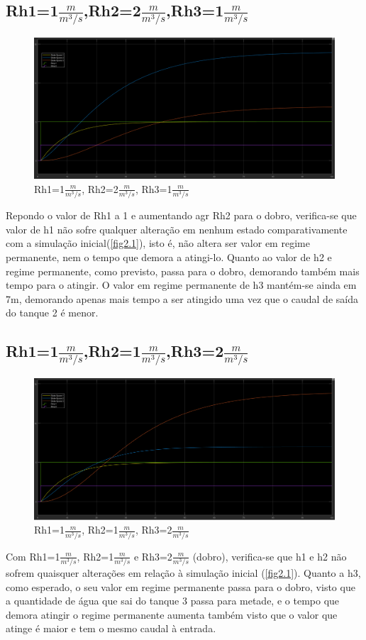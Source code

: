 \documentclass[11pt]{article}
\begin{document}
\subsection{Rh1=1$\frac{m}{m^3/s}$,Rh2=2$\frac{m}{m^3/s}$,Rh3=1$\frac{m}{m^3/s}$}
\begin{figure}[!h]
\includegraphics[width=16cm]{rh2.png}
\caption{Rh1=1$\frac{m}{m^3/s}$, Rh2=2$\frac{m}{m^3/s}$, Rh3=1$\frac{m}{m^3/s}$}
\label{fig2.3}
\end{figure}
Repondo o valor de Rh1 a 1 e aumentando agr Rh2 para o dobro, verifica-se que valor de h1 não sofre qualquer alteração em nenhum estado comparativamente com a simulação inicial(\ref{fig2.1}), isto é, não altera ser valor em regime permanente, nem o tempo que demora a atingi-lo. Quanto ao valor de h2 e regime permanente, como previsto, passa para o dobro, demorando também mais tempo para o atingir. O valor em regime permanente de h3 mantém-se ainda em 7m, demorando apenas mais tempo a ser atingido uma vez que o caudal de saída do tanque 2 é menor. 

\pagebreak
\subsection{Rh1=1$\frac{m}{m^3/s}$,Rh2=1$\frac{m}{m^3/s}$,Rh3=2$\frac{m}{m^3/s}$}
\begin{figure}[!h]
\includegraphics[width=16cm]{rh3.png}
\caption{Rh1=1$\frac{m}{m^3/s}$, Rh2=1$\frac{m}{m^3/s}$, Rh3=2$\frac{m}{m^3/s}$}
\label{fig2.4}
\end{figure}
Com Rh1=1$\frac{m}{m^3/s}$, Rh2=1$\frac{m}{m^3/s}$ e Rh3=2$\frac{m}{m^3/s}$ (dobro), verifica-se que h1 e h2 não sofrem quaisquer alterações em relação à simulação inicial (\ref{fig2.1}). Quanto a h3, como esperado, o seu valor em regime permanente passa para o dobro, visto que a quantidade de água que sai do tanque 3 passa para metade, e o tempo que demora atingir o regime permanente aumenta também visto que o valor que atinge é maior e tem o mesmo caudal à entrada.
\pagebreak
\end{document}
